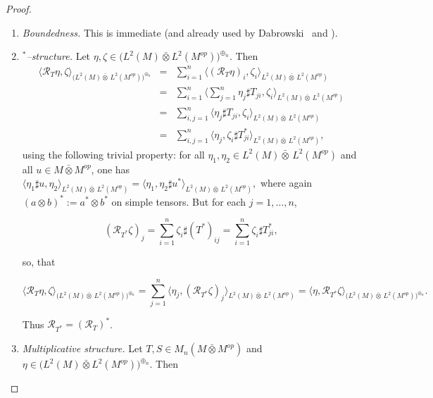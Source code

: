 \documentclass[10pt,a4paper,reqno]{amsart}
\begin{document}
\begin{proof}
\begin{enumerate}

\item \emph{Boundedness.}
This is immediate (and already used by Dabrowski~\cite[Proof of Theorem~17]{Dab14} and \cite{Dab14v2}).

\item \emph{$^\ast$–structure.}
Let $\eta,\zeta\in\big(L^2(M){\bar\otimes}L^2(M^{op})\big)^{\oplus_n}$. Then
\begin{eqnarray}
\big\langle \mathcal R_T\eta, \zeta\big\rangle_{\big(L^2(M){\bar\otimes}\,L^2(M^{op})\big)^{\oplus_n}}
&=& \sum_{i=1}^n \big\langle (\mathcal R_T\eta)_i,\zeta_i\big\rangle_{L^2(M){\bar\otimes}\,L^2(M^{op})} \nonumber\\
&=& \sum_{i=1}^n \big\langle \sum_{j=1}^n \eta_j\sharp T_{ji}, \zeta_i\big\rangle_{L^2(M){\bar\otimes}\,L^2(M^{op})} \nonumber\\
&=& \sum_{i,j=1}^n \big\langle \eta_j\sharp T_{ji}, \zeta_i\big\rangle_{L^2(M){\bar\otimes}\,L^2(M^{op})} \nonumber\\
&=& \sum_{i,j=1}^n \big\langle \eta_j, \zeta_i\sharp T_{ji}^\ast\big\rangle_{L^2(M){\bar\otimes}\,L^2(M^{op})},
\end{eqnarray}
using the following trivial property: for all $\eta_1,\eta_2\in L^2(M){\bar\otimes}\,L^2(M^{op})$ and all $u\in M\bar\otimes M^{op}$,
one has $
\big\langle \eta_1\sharp u, \eta_2\big\rangle_{L^2(M){\bar\otimes}\,L^2(M^{op})}
=
\big\langle \eta_1, \eta_2\sharp u^\ast\big\rangle_{L^2(M){\bar\otimes}\,L^2(M^{op})},
$
where again $(a\otimes b)^\ast:=a^\ast\otimes b^\ast$ on simple tensors.
\newline
But for each $j=1,\ldots,n$, 


\[
(\mathcal R_{T^\ast}\zeta)_j
= \sum_{i=1}^n \zeta_i\sharp (T^\ast)_{ij}
= \sum_{i=1}^n \zeta_i\sharp T_{ji}^\ast,
\]


so, that


\[
\big\langle \mathcal R_T\eta,\zeta\big\rangle_{\big(L^2(M){\bar\otimes}\,L^2(M^{op})\big)^{\oplus_n}}
= \sum_{j=1}^n \big\langle \eta_j, (\mathcal R_{T^\ast}\zeta)_j\big\rangle_{L^2(M){\bar\otimes}\,L^2(M^{op})}
= \big\langle \eta, \mathcal R_{T^\ast}\zeta\big\rangle_{\big(L^2(M){\bar\otimes}\,L^2(M^{op})\big)^{\oplus_n}}.
\]


Thus $\mathcal R_{T^\ast}=(\mathcal R_T)^\ast$.

\item \emph{Multiplicative structure.}
Let $T,S\in M_n(M\bar\otimes M^{op})$ and 
$\eta\in\big(L^2(M){\bar\otimes}L^2(M^{op})\big)^{\oplus_n}$.
Then



\end{enumerate}
\end{proof}
\end{document}
